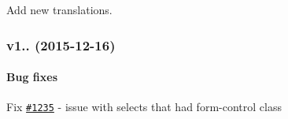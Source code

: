Add new translations.





\subsubsection*{v1.. (2015-\/12-\/16)}

\paragraph*{Bug fixes}


\begin{DoxyItemize}
\item Fix \href{https://github.com/silviomoreto/bootstrap-select/issues/1235}{\tt \#1235} -\/ issue with selects that had {\ttfamily form-\/control} class 
\end{DoxyItemize}